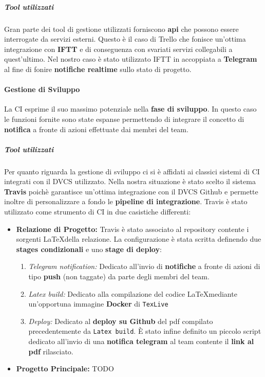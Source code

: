 \subparagraph{Tool utilizzati}
Gran parte dei tool di gestione utilizzati forniscono \textbf{api} che possono essere interrogate da servizi esterni. Questo è il caso di Trello che fonisce un'ottima integrazione con \textbf{IFTT} e di conseguenza con svariati servizi collegabili a quest'ultimo. Nel nostro caso è stato utilizzato IFTT in accoppiata a \textbf{Telegram} al fine di fonire \textbf{notifiche realtime} sullo stato di progetto.


\paragraph{Gestione di Sviluppo}
La CI esprime il suo massimo potenziale nella \textbf{fase di sviluppo}. In questo caso le funzioni fornite sono state espanse permettendo di integrare il concetto di \textbf{notifica} a fronte di azioni effettuate dai membri del team.

\subparagraph{Tool utilizzati}
Per quanto riguarda la gestione di sviluppo ci si è affidati ai classici sistemi di CI integrati con il DVCS utilizzato. Nella nostra situazione è stato scelto il sistema \textbf{Travis} poichè garantisce un'ottima integrazione con il DVCS Github e permette inoltre di personalizzare a fondo le \textbf{pipeline di integrazione}. Travis è stato utilizzato come strumento di CI in due casistiche differenti: 
\begin{itemize}
	\item{\textbf{Relazione di Progetto:}}
	Travis è stato associato al repository contente i sorgenti \LaTeX della relazione. La configurazione è stata scritta definendo due \textbf{stages condizionali} e uno \textbf{stage di deploy}:
	\begin{enumerate}
	 	\item{\textit{Telegram notification:}}
	 	Dedicato all'invio di \textbf{notifiche} a fronte di azioni di tipo \textbf{push} (non taggate) da parte degli membri del team.
	 	\item{\textit{Latex build:}}
	 	Dedicato alla compilazione del codice \LaTeX mediante un'opportuna immagine \textbf{Docker} di \texttt{TexLive}  
	 	\item{\textit{Deploy:}}
	 	Dedicato al \textbf{deploy su Github} del pdf compilato precedentemente da \texttt{Latex build}. È stato infine definito un piccolo script dedicato all'invio di una \textbf{notifica telegram} al team contente il \textbf{link al pdf} rilasciato.
	 \end{enumerate}
	 \item{\textbf{Progetto Principale:}}
	 \huge TODO
\end{itemize}









